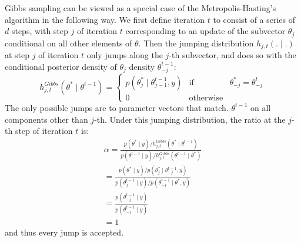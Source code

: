 \documentclass[lecture,12pt,]{pcms-l}
\numberwithin{section}{chapter}
\numberwithin{equation}{chapter}
\theoremstyle{plain}
\theoremstyle{definition}
\theoremstyle{definition}
\begin{document}
\begin{enumerate}
\begin{itemize}
Gibbs sampling can be viewed as a special case of the Metropolis-Hasting's algorithm in the following way. We first define iteration $t$ to consist of a series of $d$ steps, with step $j$ of iteration $t$ corresponding to an update of the subvector $\theta_j$ conditional on all other elements of $\theta$. Then the jumping distribution $h_{j,t}(. \mid .)$ at step $j$ of iteration $t$ only jumps along the $j$-th subvector, and does so with the conditional posterior density of $\theta_j$ density $\theta_{-j}^{t-1}$:
\begin{equation}
h_{j,t}^{Gibbs}(\theta^* \mid \theta^{t-1})= 
\left\{\begin{matrix}
p(\theta_{j}^{*} \mid \theta_{j-1}^{t-1},y) & \text{if} & \theta_{-j}^{*}=\theta_{-j}^{t}\\ 
0 & \text{otherwise} & 
\end{matrix}\right.
\end{equation}
The only possible jumps are to parameter vectors that match. $\theta^{t-1}$ on all components other than $j$-th. Under this jumping distribution, the ratio at the $j$-th step of iteration $t$ is:
\begin{equation}
\begin{split}
\alpha=\frac{p(\theta^* \mid y )/h_{j,t}^{Gibbs}(\theta^* \mid \theta^{t-1})}{ p(\theta^{t-1} \mid y )/h_{j,t}^{Gibbs}(\theta^{t-1} \mid \theta^{*})}
\\
=\frac{p(\theta^* \mid y )/p(\theta^{*}_{j} \mid \theta^{t-1}_{-j},y)}{ p(\theta^{t-1}_{j} \mid y )/p(\theta^{t-1}_{-j} \mid \theta^{*},y)}
\\
=\frac{p(\theta^{t-1}_{-j} \mid y)}{ p(\theta^{t-1}_{-j} \mid y)}
\\
=1
\end{split}
\end{equation}
and thus every jump is accepted.
 \end{itemize}

\end{enumerate}
\end{document}
